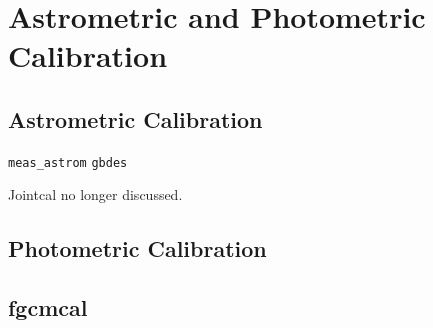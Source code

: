 \section{Astrometric and Photometric Calibration}

\subsection{Astrometric Calibration}

\texttt{meas\_astrom}
\texttt{gbdes}

Jointcal no longer discussed.

\subsection{Photometric Calibration}

\subsection{fgcmcal}
